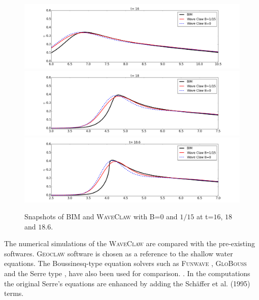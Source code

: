 \documentclass[review]{elsarticle}
\begin{document}
\begin{figure}[!htb]
\centering
\includegraphics[width=.9\textwidth]{_fig/bim_dgeo_160.png}\\
\includegraphics[width=.9\textwidth]{_fig/bim_dgeo_180.png}\\
\includegraphics[width=.9\textwidth]{_fig/bim_dgeo_186.png}
\caption{Snapshots of BIM and \textsc{WaveClaw} with B=$0$ and $1/15$ at t=$16$, $18$ and $18.6$.}
\label{fig:bim_dgeo}
\end{figure}

The numerical simulations of 
the \textsc{WaveClaw} are compared
with the pre-existing softwares. 
\textsc{Geoclaw} software \cite{clawpack} is chosen
as a reference to the shallow water equations.
The Boussinesq-type equation solvers
such as \textsc{Funwave} \cite{shi2012high}, \textsc{GloBouss} \cite{lovholt2010coupling} and the Serre type \cite{Lovholt:2013a}, 
have also been used for comparison. . 
In the computations 
the original Serre's equations are enhanced by adding the Sch{\"a}ffer et al. (1995) \cite{schaffer1995further} terms. 
\end{document}

